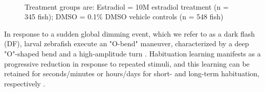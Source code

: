 \documentclass[9pt,lineno]{RandlettLab_elife}
\begin{document}
\begin{figure}
\begin{fullwidth}
\begin{center}
{\\ Treatment groups are: Estradiol = 10\textmu M estradiol treatment (n = 345 fish); DMSO = 0.1\% DMSO vehicle controls (n = 548 fish)
}

\label{fig:1}

\end{center}
\end{fullwidth}
\end{figure}

In response to a sudden global dimming event, which we refer to as a dark flash (DF), larval zebrafish execute an "O-bend" maneuver, characterized by a deep "O"-shaped bend and a high-amplitude turn \citep{Burgess2007}. 
Habituation learning manifests as a progressive reduction in response to repeated stimuli, and this learning can be retained for seconds/minutes or hours/days for short- and long-term habituation, respectively \citep{Rankin2009-no}. 
\end{document}

